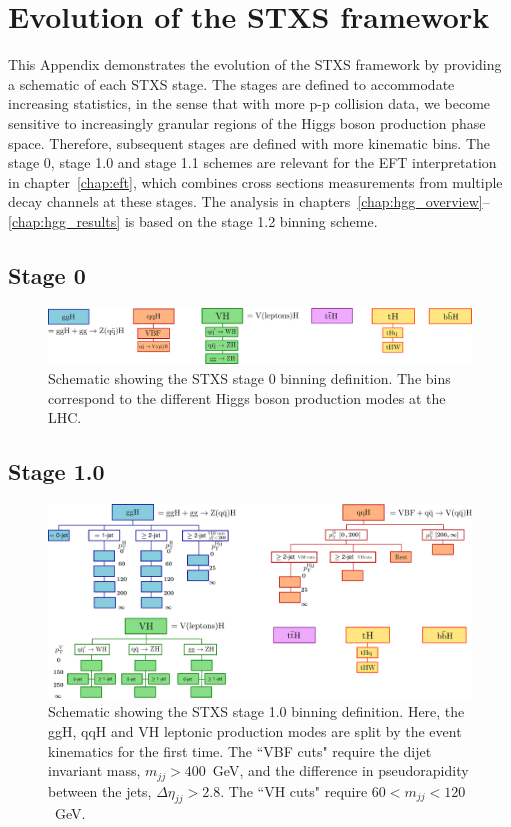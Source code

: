 \chapter{Evolution of the STXS framework}\label{app:merging_schemes}
This Appendix demonstrates the evolution of the STXS framework by providing a schematic of each STXS stage. The stages are defined to accommodate increasing statistics, in the sense that with more p-p collision data, we become sensitive to increasingly granular regions of the Higgs boson production phase space. Therefore, subsequent stages are defined with more kinematic bins. The stage 0, stage 1.0 and stage 1.1 schemes are relevant for the EFT interpretation in chapter~\ref{chap:eft}, which combines cross sections measurements from multiple decay channels at these stages. The \Hgg analysis in chapters~\ref{chap:hgg_overview}--\ref{chap:hgg_results} is based on the stage 1.2 binning scheme. 
\section{Stage 0}
\begin{figure}[htb!]
  \centering
  \includegraphics[width=.9\linewidth]{Figures/app_merging_schemes/stage0.pdf}
  \caption[Schematic of the STXS stage 0 binning scheme]
  {
    Schematic showing the STXS stage 0 binning definition. The bins correspond to the different Higgs boson production modes at the LHC.
  }
  \label{fig:stxs_schematic_stage0}
\end{figure}
\newpage
\FloatBarrier
\section{Stage 1.0}
\begin{figure}[htb!]
  \centering
  \includegraphics[width=.9\linewidth]{Figures/app_merging_schemes/stage1p0.pdf}
  \caption[Schematic of the STXS stage 1.0 binning scheme]
  {
    Schematic showing the STXS stage 1.0 binning definition. Here, the ggH, qqH and VH leptonic production modes are split by the event kinematics for the first time. The ``VBF cuts" require the dijet invariant mass, $m_{jj}>400$~GeV, and the difference in pseudorapidity between the jets, $\Delta\eta_{jj}>2.8$. The ``VH cuts" require $60<m_{jj}<120$~GeV.
  }
  \label{fig:stxs_schematic_stage1p0}
\end{figure}
\FloatBarrier
